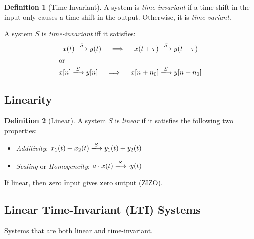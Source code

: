 \documentclass[10pt,UTF8]{article}
\newenvironment{definition box}
{\begin{tcolorbox}[colback=blue!5!white,colframe=blue!75!black,parbox=false,before upper=\par,before lower=\par]}
{\end{tcolorbox}}
\theoremstyle{definition}
\newtheorem*{definition inner}{Definition}
\newenvironment{definition}[1][]
{\begin{definition box}\begin{definition inner}[#1]\hfill\par}
{\end{definition inner}\end{definition box}}
\theoremstyle{remark}
\begin{document}
\begin{definition}[Time-Invariant]
    A system is \emph{time-invariant} if a time shift in the input only
    causes a time shift in the output.
    Otherwise, it is \emph{time-variant}.
\end{definition}

A system $S$ is \emph{time-invariant} iff it satisfies:
\begin{gather*}
    x(t) \xlongrightarrow{S} y(t) \quad \implies \quad
    x(t+\tau) \xlongrightarrow{S} y(t+\tau) \\
    \shortintertext{or}
    x[n] \xlongrightarrow{S} y[n] \quad \implies \quad
    x[n+n_0] \xlongrightarrow{S} y[n+n_0]
\end{gather*}

\subsection{Linearity}

\begin{definition}[Linear]
    A system $S$ is \emph{linear} if it satisfies the following two properties:
    \begin{itemize}
        \item \emph{Additivity}: 
            $x_1(t) + x_2(t) \xlongrightarrow{S} y_1(t) + y_2(t)$
        \item \emph{Scaling} or \emph{Homogeneity}:
            $a\cdot x(t) \xlongrightarrow{S} \cdot y(t)$
    \end{itemize}
\end{definition}

If linear, then \textbf{z}ero \textbf{i}nput gives \textbf{z}ero \textbf{o}utput (ZIZO).


\subsection{Linear Time-Invariant (LTI) Systems}

Systems that are both linear and time-invariant.
\end{document}
